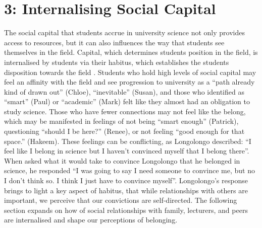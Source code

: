 \section{3: Internalising Social Capital}
The social capital that students accrue in university science not only provides access to resources, but it can also influences the way that students see themselves in the field. Capital, which determines students position in the field, is internalised by students via their habitus, which establishes the students disposition towards the field \cite{Bourdieu1992}. Students who hold high levels of social capital may feel an affinity with the field and see progression to university as a ``path already kind of drawn out'' (Chloe), ``inevitable'' (Susan), and those who identified as ``smart'' (Paul) or ``academic'' (Mark) felt like they almost had an obligation to study science. Those who have fewer connections may not feel like the belong, which may be manifested in feelings of not being ``smart enough'' (Patrick), questioning ``should I be here?'' (Renee), or not feeling ``good enough for that space.'' (Hakeem). These feelings can be conflicting, as Longolongo described: ``I feel like I belong in science but I haven’t convinced myself that I belong there''. When asked what it would take to convince Longolongo that he belonged in science, he responded ``I was going to say I need someone to convince me, but no I don’t think so. I think I just have to convince myself''. Longolongo's response brings to light a key aspect of habitus, that while relationships with others are important, we perceive that our convictions are self-directed. The following section expands on how of social relationships with family, lecturers, and peers are internalised and shape our perceptions of belonging.
 


